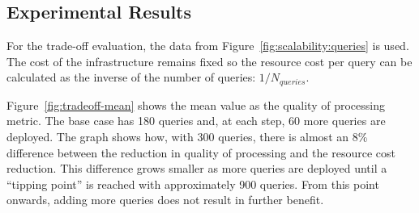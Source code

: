\subsection*{Experimental Results}

For the trade-off evaluation, the data from Figure~\ref{fig:scalability:queries} is used. The cost of the
infrastructure remains fixed so the resource cost per query can be calculated as the inverse of the
number of queries: $1/N_{queries}$.

Figure~\ref{fig:tradeoff-mean} shows the mean \sic value as the quality of processing metric. The base
case has 180 queries and, at each step, 60 more queries are deployed. The graph shows how, with 300
queries, there is almost an 8\% difference between the reduction in quality of processing and the
resource cost reduction.
This difference grows smaller as more queries are deployed until a ``tipping point'' is reached with
approximately 900 queries. From this point onwards, adding more queries does not result in further
benefit.




 